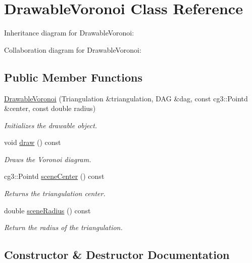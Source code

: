 \hypertarget{classDrawableVoronoi}{}\section{Drawable\+Voronoi Class Reference}
\label{classDrawableVoronoi}


Inheritance diagram for Drawable\+Voronoi\+:


Collaboration diagram for Drawable\+Voronoi\+:
\subsection*{Public Member Functions}
\begin{DoxyCompactItemize}
\item 
\hyperlink{classDrawableVoronoi_aab7fabca89392b0eb45c59b4e695855a}{Drawable\+Voronoi} (Triangulation \&triangulation, D\+AG \&dag, const cg3\+::\+Pointd \&center, const double radius)
\begin{DoxyCompactList}\small\item\em Initializes the drawable object. \end{DoxyCompactList}\item 
void \hyperlink{classDrawableVoronoi_aa10c214cfc42f752433c682760d88b70}{draw} () const
\begin{DoxyCompactList}\small\item\em Draws the Voronoi diagram. \end{DoxyCompactList}\item 
cg3\+::\+Pointd \hyperlink{classDrawableVoronoi_a1707c9e575880eeac9e981d73e03b3bf}{scene\+Center} () const
\begin{DoxyCompactList}\small\item\em Returns the triangulation center. \end{DoxyCompactList}\item 
double \hyperlink{classDrawableVoronoi_af26652a83c96748bf9a09abc6255672b}{scene\+Radius} () const
\begin{DoxyCompactList}\small\item\em Return the radius of the triangulation. \end{DoxyCompactList}\end{DoxyCompactItemize}


\subsection{Constructor \& Destructor Documentation}
\mbox{\label{classDrawableVoronoi_aab7fabca89392b0eb45c59b4e695855a}} 
